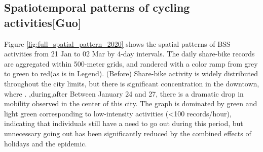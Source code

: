 \documentclass[preprints,ijgi,submit,moreauthors]{Definitions/mdpi}
\begin{document}
\subsection{Spatiotemporal patterns of cycling activities\textbf{[Guo]}}

Figure \ref{fig:full_spatial_pattern_2020} shows the spatial patterns of BSS activities from 21 Jan to 02 Mar by 4-day intervals.
The daily share-bike records are aggregated within 500-meter grids, and randered with a color ramp from grey to green to red(as is in Legend). 
(Before) Share-bike activity is widely distributed throughout the city limits, but there is significant concentration in the downtown, where .
,during,after
Between January 24 and 27, there is a dramatic drop in mobility observed in the center of this city.
The graph is dominated by green and light green corresponding to low-intensity activities (<100 records/hour), indicating that individuals still have a need to go out during this period, but unnecessary going out has been significantly reduced by the combined effects of holidays and the epidemic.
\end{document}
